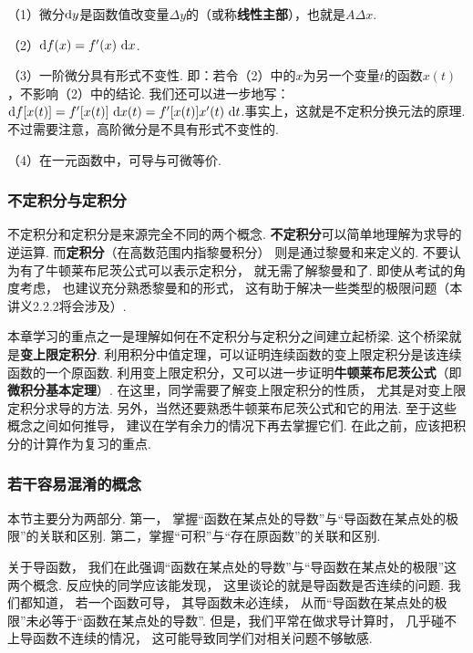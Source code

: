 （1）微分$\mathrm{d} y$是函数值改变量$\Delta y$的（或称\textbf{线性主部}），也就是$A\Delta x$.\par
（2）$\mathrm{d} f(x)=f'(x) ~\mathrm{d} x$.\par
（3）一阶微分具有形式不变性. 即：若令（2）中的$x$为另一个变量$t$的函数$x(t)$，不影响（2）中的结论. 我们还可以进一步地写：
$\mathrm{d} f[x(t)] = f'[x(t)] ~\mathrm{d} x(t) = f'[x(t)]x'(t)~\mathrm{d} t $.事实上，这就是不定积分换元法的原理.不过需要注意，高阶微分是不具有形式不变性的.\par
（4）在一元函数中，可导与可微等价. \par

\subsubsection{不定积分与定积分}\par
不定积分和定积分是来源完全不同的两个概念.
\textbf{不定积分}可以简单地理解为求导的逆运算.
而\textbf{定积分}（在高数范围内指黎曼积分）
则是通过黎曼和来定义的.
不要认为有了牛顿莱布尼茨公式可以表示定积分，
就无需了解黎曼和了.
即使从考试的角度考虑，
也建议充分熟悉黎曼和的形式，
这有助于解决一些类型的极限问题（本讲义2.2.2将会涉及）.

本章学习的重点之一是理解如何在不定积分与定积分之间建立起桥梁. 这个桥梁就是\textbf{变上限定积分}.
利用积分中值定理，可以证明连续函数的变上限定积分是该连续函数的一个原函数. 利用变上限定积分，又可以进一步证明\textbf{牛顿莱布尼茨公式}（即\textbf{微积分基本定理}）.
在这里，同学需要了解变上限定积分的性质，
尤其是对变上限定积分求导的方法.
另外，当然还要熟悉牛顿莱布尼茨公式和它的用法.
至于这些概念之间如何推导，
建议在学有余力的情况下再去掌握它们.
在此之前，应该把积分的计算作为复习的重点.

\subsubsection{若干容易混淆的概念}

本节主要分为两部分.
第一，
掌握“函数在某点处的导数”与“导函数在某点处的极限”的关联和区别.
第二，掌握“可积”与“存在原函数”的关联和区别.\vspace{0.5em}

关于导函数，
我们在此强调“函数在某点处的导数”与“导函数在某点处的极限”这两个概念.
反应快的同学应该能发现，
这里谈论的就是导函数是否连续的问题.
我们都知道，
若一个函数可导，
其导函数未必连续，
从而“导函数在某点处的极限”未必等于“函数在某点处的导数”.
但是，我们平常在做求导计算时，
几乎碰不上导函数不连续的情况，
这可能导致同学们对相关问题不够敏感.

